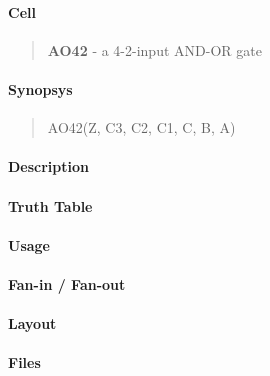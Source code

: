 \label{AO42}
\paragraph{Cell}
\begin{quote}
    \textbf{AO42} - a 4-2-input AND-OR gate
\end{quote}

\paragraph{Synopsys}
\begin{quote}
    AO42(Z, C3, C2, C1, C, B, A)
\end{quote}

\paragraph{Description}

%

\paragraph{Truth Table}
%

\paragraph{Usage}

\paragraph{Fan-in / Fan-out}

\paragraph{Layout}

\paragraph{Files}
